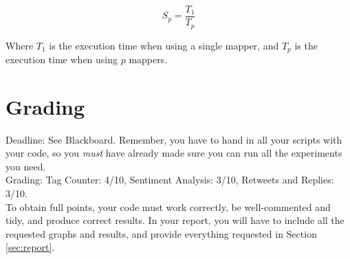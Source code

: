 \documentclass[a4paper,10pt]{article}
\begin{document}
  \[
  S_p = \frac{T_1}{T_p}
  \]
  
  Where $T_1$ is the execution time when using a single mapper, and $T_p$ is the execution time when using $p$ mappers.
  
  \section{Grading}
  Deadline: See Blackboard. Remember, you have to hand in all your scripts with your code, so you \emph{must} have already made sure you can run all the experiments you need.\\
  Grading: Tag Counter: 4/10, Sentiment Analysis: 3/10, Retweets and Replies: 3/10.  \\
  To obtain full points, your code must work correctly, be well-commented and tidy, and produce correct results. In your report, you will have to include all the requested graphs and results, and provide everything requested in Section \ref{sec:report}.
\end{document}
